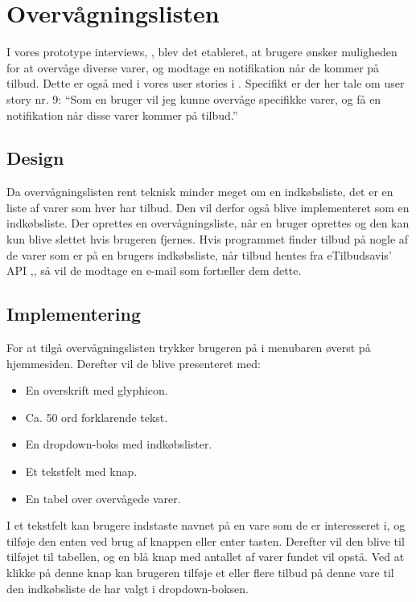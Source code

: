 \section{Overvågningslisten}
I vores prototype interviews, , blev det etableret, at brugere ønsker muligheden for at overvåge diverse varer, og modtage en notifikation når de kommer på tilbud.
Dette er også med i vores user stories i .
Specifikt er der her tale om user story nr. 9: ``Som en bruger vil jeg kunne overvåge specifikke varer, og få en notifikation når disse varer kommer på tilbud.''
\subsection{Design}
Da overvågningslisten rent teknisk minder meget om en indkøbsliste, det er en liste af varer som hver har tilbud.
Den vil derfor også blive implementeret som en indkøbsliste. 
Der oprettes en overvågningsliste, når en bruger oprettes og den kan kun blive slettet hvis brugeren fjernes.
Hvis programmet finder tilbud på nogle af de varer som er på en brugers indkøbsliste, når tilbud hentes fra eTilbudsavis' API ,, så vil de modtage en e-mail som fortæller dem dette. 
\subsection{Implementering} 
For at tilgå overvågningslisten trykker brugeren på  i menubaren øverst på hjemmesiden.
Derefter vil de blive presenteret med:
\begin{itemize} 
	\item En overskrift med glyphicon.
	\item Ca. 50 ord forklarende tekst.
	\item En dropdown-boks med indkøbslister.
	\item Et tekstfelt med knap.
	\item En tabel over overvågede varer.
\end{itemize}
I et tekstfelt kan brugere indstaste navnet på en vare som de er interesseret i, og tilføje den enten ved brug af knappen eller enter tasten.
Derefter vil den blive til tilføjet til tabellen, og en blå knap med antallet af varer fundet vil opstå.
Ved at klikke på denne knap kan brugeren tilføje et eller flere tilbud på denne vare til den indkøbsliste de har valgt i dropdown-boksen.

